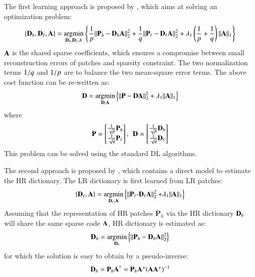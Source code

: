 The first learning approach is proposed by \cite{yang2010image}, which aims at solving an optimization problem:
\begin{equation}
\left\lbrace \mathbf{D}_h ,\mathbf{D}_\ell, \mathbf{A}  \right\rbrace = \operatorname*{\arg\!\min}_{\mathbf{D}_h ,\mathbf{D}_\ell ,A} \left\lbrace \frac{1}{p} \Vert \mathbf{P}_h-\mathbf{D}_h \mathbf{A}\Vert^2_2 + \frac{1}{q} \Vert \mathbf{P}_\ell-\mathbf{D}_\ell \mathbf{A}\Vert^2_2 + \lambda_1 \left( \frac{1}{p}+\frac{1}{q} \right) \Vert \mathbf{A} \Vert_1 \right\rbrace
\label{eq:jointlearning2}
\end{equation}
$ \mathbf{A} $ is the shared sparse coefficients, which ensures a compromise between small reconstruction errors of patches and sparsity constraint. The two normalization terms $ 1/q  $ and $ 1/p $ are to balance the two mean-square error terms. The above cost function can be re-written as:
\begin{equation}
\mathbf{D} = \operatorname*{\arg\!\min}_{\mathbf{D},\mathbf{A}} \left\lbrace \Vert \mathbf{P}-\mathbf{D} \mathbf{A}\Vert^2_2 + \lambda_1 \Vert \mathbf{A} \Vert_1 \right \rbrace
\label{eq:jointlearning3}
\end{equation}
where
\begin{equation}
\mathbf{P}= \begin{bmatrix} \frac{1}{\sqrt{p}}\mathbf{P}_h \\ \frac{1}{\sqrt{q}}\mathbf{P}_\ell \end{bmatrix}, \:\: \mathbf{D}= \begin{bmatrix} \frac{1}{\sqrt{p}}\mathbf{D}_h  \\ \frac{1}{\sqrt{q}}\mathbf{D}_\ell  \end{bmatrix}
\label{eq:jointlearning4}
\end{equation}
This problem can be solved using the standard DL algorithms.

The second approach is proposed by \citet{zeyde2012single}, which contains a direct model to estimate the HR dictionary. The LR dictionary is first learned from LR patches:
\begin{equation}
\left\lbrace \mathbf{D}_\ell ,\mathbf{A} \right\rbrace =\operatorname*{\arg\!\min}_{\mathbf{D}_\ell, \mathbf{A}}  \left\lbrace \operatorname{\Arrowvert \mathit{\mathbf{P}_\ell-\mathbf{D}_\ell \mathbf{A}} \Arrowvert^2_2 } + \lambda_1\Vert \mathbf{A} \Vert_1 \right \rbrace
\label{eq:jointlearning5}
\end{equation}
Assuming that the representation of HR patches $ \mathbf{P}_h $ via the HR dictionary $ \mathbf{D}_h  $ will share the same sparse code $ \mathbf{A} $, HR dictionary is estimated as:
\begin{equation}
\mathbf{D}_h  = \operatorname*{\arg\!\min}_{\mathbf{D}_h } \left\lbrace \Vert \mathbf{P}_h-\mathbf{D}_h \mathbf{A}\Vert^2_2  \right \rbrace
\label{eq:jointlearning6}
\end{equation}
for which the solution is easy to obtain by a pseudo-inverse:
\begin{equation}
\mathbf{D}_h =\mathbf{P}_h \mathbf{A}^{\dagger}=\mathbf{P}_h\mathbf{A}^{\intercal}(\mathbf{A}\mathbf{A}^{\intercal})^{-1}
\label{eq:jointlearning7}
\end{equation}

